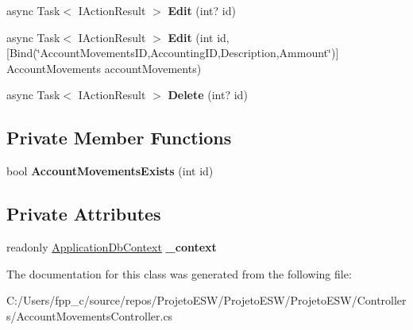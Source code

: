 \begin{DoxyCompactItemize}
\mbox{\label{class_projeto_e_s_w_1_1_controllers_1_1_account_movements_controller_a2e5653943c3511dae5eee46906844fb3}} 
async Task$<$ I\+Action\+Result $>$ {\bfseries Edit} (int? id)
\item 
\mbox{\label{class_projeto_e_s_w_1_1_controllers_1_1_account_movements_controller_a610fb998d84618ae22ef06d4138313da}} 
async Task$<$ I\+Action\+Result $>$ {\bfseries Edit} (int id, \mbox{[}Bind(\char`\"{}Account\+Movements\+ID,Accounting\+ID,Description,Ammount\char`\"{})\mbox{]} Account\+Movements account\+Movements)
\item 
\mbox{\label{class_projeto_e_s_w_1_1_controllers_1_1_account_movements_controller_a4831d760280a8d15e485a24b33a2b898}} 
async Task$<$ I\+Action\+Result $>$ {\bfseries Delete} (int? id)
\end{DoxyCompactItemize}
\subsection*{Private Member Functions}
\begin{DoxyCompactItemize}
\item 
\mbox{\label{class_projeto_e_s_w_1_1_controllers_1_1_account_movements_controller_ad7e3e7d4d2707f24a41b6bd730fbae51}} 
bool {\bfseries Account\+Movements\+Exists} (int id)
\end{DoxyCompactItemize}
\subsection*{Private Attributes}
\begin{DoxyCompactItemize}
\item 
\mbox{\label{class_projeto_e_s_w_1_1_controllers_1_1_account_movements_controller_a6dc91e1af735bcb74fb7cafa1bf31720}} 
readonly \mbox{\hyperlink{class_projeto_e_s_w_1_1_data_1_1_application_db_context}{Application\+Db\+Context}} {\bfseries \+\_\+context}
\end{DoxyCompactItemize}


The documentation for this class was generated from the following file\+:\begin{DoxyCompactItemize}
\item 
C\+:/\+Users/fpp\+\_\+c/source/repos/\+Projeto\+E\+S\+W/\+Projeto\+E\+S\+W/\+Projeto\+E\+S\+W/\+Controllers/Account\+Movements\+Controller.\+cs\end{DoxyCompactItemize}
